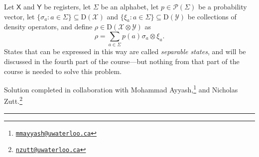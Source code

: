 \documentclass[boxes,pages,color=SeaGreen]{homework}
\newcommand{\collab}[1]{\footnote{\href{mailto:#1}{\texttt{#1}}}}
\newcommand{\tinyspace}{\mspace{1mu}}
\renewcommand{\op}[1]{\operatorname{#1}}
\newcommand{\X}{\mathcal{X}}
\newcommand{\Y}{\mathcal{Y}}
\renewcommand{\P}{\mathcal{P}}
\newcommand{\reg}[1]{\mathsf{#1}}
\newcommand{\Density}{\mathrm{D}}
\begin{document}

\begin{problem}
Let $\reg{X}$ and $\reg{Y}$ be registers, let $\Sigma$ be an alphabet,
let $p\in\P(\Sigma)$ be a probability vector, let
$\{\sigma_a : a\in\Sigma\}\subseteq\Density(\X)$ and
$\{\xi_a : a\in\Sigma\}\subseteq\Density(\Y)$ be collections of density
operators, and define $\rho\in\Density(\X\otimes\Y)$ as
\begin{equation*}
    \rho = \sum_{a\in\Sigma} p(a)\tinyspace\sigma_a\otimes\xi_a.
\end{equation*}
States that can be expressed in this way are called \emph{separable states},
and will be discussed in the fourth part of the course---but nothing from
that part of the course is needed to solve this problem.

\end{problem}

\noindent Solution completed in collaboration with Mohammad Ayyash,\collab{mmayyash@uwaterloo.ca} and Nicholas Zutt.\collab{nzutt@uwaterloo.ca}

{\noindent\color{SeaGreen!30}\rule{\textwidth}{1.5pt}}
\end{document}
